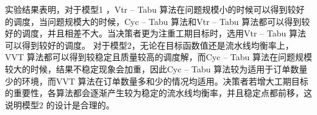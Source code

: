 实验结果表明，对于模型1 ，Vtr -- Tabu 算法在问题规模小的时候可以得到较好的调度，当问题规模大的时候，Cyc -- Tabu 算法和Vtr -- Tabu  算法都可以得到较好的调度，并且相差不大。当决策者更为注重工期目标时，选用Vtr -- Tabu 算法可以得到较好的调度。
对于模型2，无论在目标函数值还是流水线均衡率上，VVT 算法都可以得到较稳定且质量较高的调度解，而Cyc -- Tabu 算法在问题规模较大的时候，结果不稳定现象会加重，因此Cyc -- Tabu 算法较为适用于订单数量少的环境，而VVT 算法在订单数量多和少的情况均适用。决策者若增大工期目标的重要性，各算法都会逐渐产生较为稳定的流水线均衡率，并且稳定点都前移，这说明模型2 的设计是合理的。